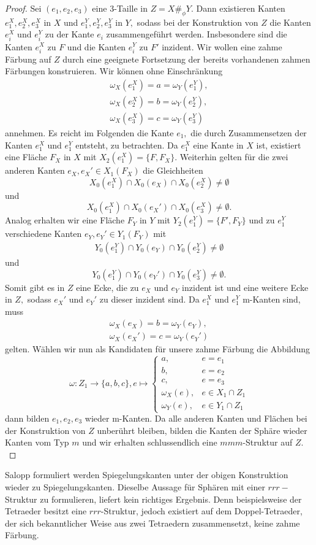 \documentclass[12pt,titlepage,twoside,cleardoublepage]{article}
\theoremstyle{nummermitklammern}
\numberwithin{equation}{section}
\begin{document}
\begin{proof}
 Sei  $(e_1,e_2,e_3)$ eine 3-Taille in $Z=X\#_{\phi}Y$. Dann existieren Kanten $e^X_1,e^X_2,e_3^X$ in $X$ und $e^Y_1,e^Y_2,e_3^Y$ in $Y,$ sodass bei der Konstruktion von $Z$ die Kanten $e_i^X$ und $e_i^Y$ zu der Kante $e_i$ zusammengeführt werden. Insbesondere sind die Kanten $e_i^X$ zu $F$ und die Kanten $e_i^Y$ zu $F'$ inzident. Wir wollen eine zahme Färbung auf $Z$ durch eine geeignete Fortsetzung der bereits vorhandenen zahmen Färbungen konstruieren.  
Wir können ohne Einschränkung 
\begin{align*}
\omega_X(e_1^X)=a=\omega_Y(e_1^Y),\\
 \omega_X(e_2^X)=b=\omega_Y(e_2^Y),\\
 \omega_X(e_3^X)=c=\omega_Y(e_3^Y)
\end{align*}
annehmen. Es reicht im Folgenden die Kante $e_1,$ die durch Zusammensetzen der Kanten $e_1^X$ und $e_1^Y$ entsteht, zu betrachten. Da $e_1^X$ eine Kante in $X$ ist, existiert eine Fläche $F_X$ in $X$ mit $X_2(e_1^X)=\{F,F_X\}$. Weiterhin gelten für die zwei anderen Kanten $e_X,e_X'\in X_1(F_X) $ die Gleichheiten
\[
X_0(e_1^X)\cap X_0(e_X) \cap X_0(e_2^X)\neq \emptyset
\]
und 
\[
X_0(e_1^X)\cap X_0(e_X') \cap X_0(e_3^X)\neq \emptyset.
\]
 Analog erhalten wir eine Fläche $F_Y$ in $Y$ mit $Y_2(e_1^Y)=\{F',F_Y\}$ und zu $e_1^Y$ verschiedene Kanten $e_Y,e_Y'\in Y_1(F_Y)$ mit 
\begin{align*}
Y_0(e_1^Y)\cap Y_0(e_Y) \cap Y_0(e_2^Y)\neq \emptyset
\end{align*}
und 
\[
Y_0(e_1^Y)\cap Y_0(e_Y') \cap Y_0(e_3^Y)\neq \emptyset.
\]
Somit gibt es in $Z$ eine Ecke, die zu $e_X$ und $e_Y$ inzident ist und eine weitere Ecke in $Z,$ sodass  $e_X'$ und $e_Y'$ zu dieser inzident sind.
Da $e_1^X$ und $e_1^Y$ m-Kanten sind, muss 
\begin{align*}
\omega_X(e_X)=b=\omega_Y(e_Y),\\
\omega_X(e_X')=c=\omega_Y(e_Y')
\end{align*}
gelten.
Wählen wir nun als Kandidaten für unsere zahme Färbung die Abbildung
\[
\omega: Z_1 \to\{a,b,c\},e\mapsto
 \begin{cases}
 a, &e=e_1\\
 b,& e=e_2 \\
 c, & e=e_3\\
 \omega_X(e), &e \in X_1\cap Z_1\\
 \omega_Y(e), & e\in Y_1 \cap Z_1
 \end{cases}
\]
dann bilden $e_1,e_2,e_3$ wieder m-Kanten. Da alle anderen Kanten und Flächen bei der Konstruktion von $Z$ unberührt bleiben, bilden die Kanten der Sphäre wieder Kanten vom Typ $m$ und wir erhalten schlussendlich eine $mmm$-Struktur auf $Z.$  

\end{proof}
Salopp formuliert werden Spiegelungskanten unter der obigen Konstruktion wieder zu Spiegelungskanten.
Dieselbe Aussage für Sphären mit einer $rrr-$Struktur zu formulieren, liefert kein richtiges Ergebnis. Denn beispielsweise der Tetraeder besitzt eine $rrr$-Struktur, jedoch existiert auf dem Doppel-Tetraeder, der sich bekanntlicher Weise aus zwei Tetraedern zusammensetzt, keine zahme Färbung.
\end{document}
